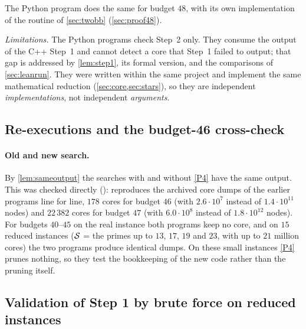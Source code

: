 \documentclass[11pt]{article}
\begin{document}
The Python program  does the same for budget $48$, with its own implementation of the routine of \cref{sec:twobb} (\cref{sec:proof48}).

\emph{Limitations.} The Python programs check Step~2 only. They consume the output of the C++ Step~1 and cannot detect a core that Step~1 failed to output; that gap is addressed by \cref{lem:step1}, its formal version, and the comparisons of \cref{sec:leanrun}. They were written within the same project and implement the same mathematical reduction (\cref{sec:core,sec:stars}), so they are independent \emph{implementations}, not independent \emph{arguments}.

\subsection{Re-executions and the budget-46 cross-check}\label{sec:rerun}



\paragraph{Old and new search.} By \cref{lem:sameoutput} the searches with and without \ref{P4} have the same output. This was checked directly ():  reproduces the archived core dumps of the earlier programs line for line, $178$ cores for budget $46$ (with $2.6\cdot10^{7}$ instead of $1.4\cdot10^{11}$ nodes) and $22\,382$ cores for budget $47$ (with $6.0\cdot10^{8}$ instead of $1.8\cdot10^{12}$ nodes). For budgets $40$--$45$ on the real instance both programs keep no core, and on $15$ reduced instances ($\mathcal{S}$ = the primes up to $13$, $17$, $19$ and $23$, with up to $21$ million cores) the two programs produce identical dumps. On these small instances \ref{P4} prunes nothing, so they test the bookkeeping of the new code rather than the pruning itself.

\subsection{Validation of Step 1 by brute force on reduced instances}\label{sec:bruteforce}
\end{document}
